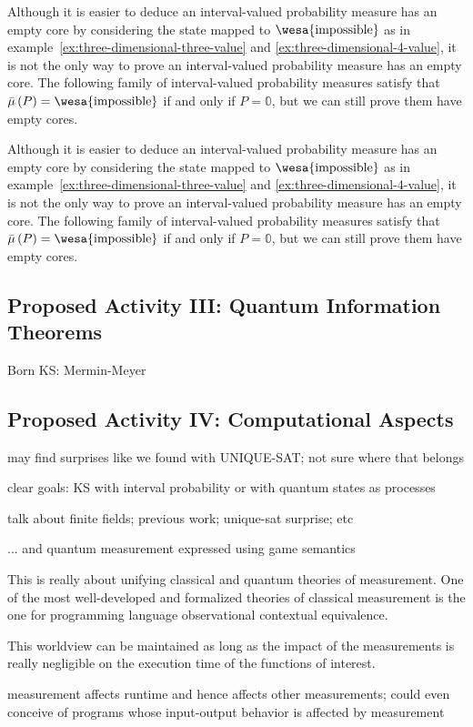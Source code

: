 \documentclass{article}
\theoremstyle{remark}
\newcommand{\imposs}{{\mbox{\wesa{impossible}}}}
\begin{document}
Although it is easier to deduce an interval-valued probability measure
has an empty core by considering the state mapped to $\imposs$ as
in example~\ref{ex:three-dimensional-three-value} and \ref{ex:three-dimensional-4-value},
it is not the only way to prove an interval-valued probability measure
has an empty core. The following family of interval-valued probability
measures satisfy that $\bar{\mu}\left(P\right)=\imposs$ if and only
if $P=\mathbb{0}$, but we can still prove them have empty cores.

Although it is easier to deduce an interval-valued probability measure
has an empty core by considering the state mapped to $\imposs$ as
in example~\ref{ex:three-dimensional-three-value} and \ref{ex:three-dimensional-4-value},
it is not the only way to prove an interval-valued probability measure
has an empty core. The following family of interval-valued probability
measures satisfy that $\bar{\mu}\left(P\right)=\imposs$ if and only
if $P=\mathbb{0}$, but we can still prove them have empty cores.

\subsection{Proposed Activity III: Quantum Information Theorems} 

Born
KS: Mermin-Meyer

\subsection{Proposed Activity IV: Computational Aspects}

may find surprises like we found with UNIQUE-SAT; not sure where that belongs 

clear goals: KS with interval probability or with quantum states as
processes

talk about finite fields; previous work; unique-sat surprise; etc

... and quantum measurement expressed using game semantics
 
This is really about unifying classical and quantum theories of
measurement. One of the most well-developed and formalized theories of
classical measurement is the one for programming language
observational contextual equivalence.


This worldview can be maintained as long as the impact of the
measurements is really negligible on the execution time of the
functions of interest.

measurement affects runtime and hence affects other measurements;
could even conceive of programs whose input-output behavior is
affected by measurement
\end{document}
